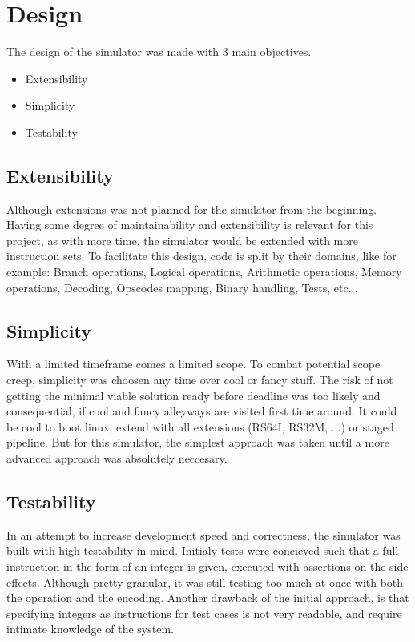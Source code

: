 \section{Design}
The design of the simulator was made with 3 main objectives.
\begin{itemize}
    \item Extensibility
    \item Simplicity
    \item Testability
\end{itemize}


\subsection{Extensibility}
Although extensions was not planned for the simulator from the beginning.
Having some degree of maintainability and extensibility is relevant for this project, as with more time, the simulator would be extended with more instruction sets.
To facilitate this design, code is split by their domains, like for example: 
Branch operations, Logical operations, Arithmetic operations, Memory operations, Decoding, Opscodes mapping, Binary handling, Tests, etc...

\subsection{Simplicity}
With a limited timeframe comes a limited scope. To combat potential scope creep, simplicity was choosen any time over cool or fancy stuff.
The risk of not getting the minimal viable solution ready before deadline was too likely and consequential, if cool and fancy alleyways are visited first time around.
It could be cool to boot linux, extend with all extensions (RS64I, RS32M, ...) or staged pipeline.
But for this simulator, the simplest approach was taken until a more advanced approach was absolutely neccesary.

\subsection{Testability}
In an attempt to increase development speed and correctness, the simulator was built with high testability in mind.
Initialy tests were concieved such that a full instruction in the form of an integer is given, executed with assertions on the side effects.
Although pretty granular, it was still testing too much at once with both the operation and the encoding.
Another drawback of the initial approach, is that specifying integers as instructions for test cases is not very readable, and require intimate knowledge of the system.

